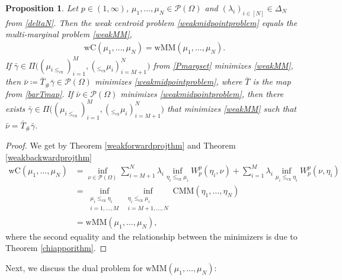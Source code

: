 \documentclass[10pt,a4paper]{amsart}
\newtheorem{prop}[thm]{Proposition}
\begin{document}
\begin{prop}\label{midpoint=MMprop}
	Let $p\in(1,\infty)$, $\mu_1,\dots,\mu_N\in\mathcal P(\Omega)$ and $(\lambda_i)_{i\in[N]}\in\Delta_N$ from \eqref{deltaN}. Then the weak centroid problem \eqref{weakmidpointproblem} equals the multi-marginal problem \eqref{weakMM},
	\begin{gather*}
			\text{wC}(\mu_1,\dots,\mu_N)=\text{wMM}(\mu_1,\dots,\mu_N).
	\end{gather*}
	If $\bar\gamma\in\Pi\big((\mu_{i\leq_{\text{cx}}})_{i=1}^M,(_{\leq_{\text{cx}}}\mu_i)_{i=M+1}^N\big)$ from \eqref{Pmargset} minimizes \eqref{weakMM}, then $\bar\nu\coloneqq\bar T_{\#}\bar\gamma\in\mathcal P(\Omega)$ minimizes \eqref{weakmidpointproblem}, where $\bar T$ is the map from \eqref{barTmap}. If $\bar\nu\in\mathcal P(\Omega)$ minimizes \eqref{weakmidpointproblem}, then there exists $\bar\gamma\in\Pi\big((\mu_{i\leq_{\text{cx}}})_{i=1}^M,(_{\leq_{\text{cx}}}\mu_i)_{i=M+1}^N\big)$ that minimizes \eqref{weakMM} such that $\bar\nu=\bar T_{\#}\bar\gamma$.
\end{prop}
\begin{proof}
	We get by Theorem \ref{weakforwardprojthm} and Theorem \ref{weakbackwardprojthm}
	\begin{align*}
		\text{wC}(\mu_1,\dots,\mu_N)
		&=\inf_{\nu\in\mathcal P(\Omega)}\sum_{i=M+1}^N\mathcal \lambda_i \inf_{\eta_i\leq_{\text{cx}}\mu_i}W_p^p(\eta_i,\nu)+\sum_{i=1}^M\lambda_i\inf_{\mu_i\leq_{\text{cx}}\eta_i}W_p^p(\nu,\eta_i)\\
		&=\inf_{\substack{\mu_i\leq_{\text{cx}}\eta_i\\ i=1,\dots,M}}\inf_{\substack{\eta_i\leq_{\text{cx}}\mu_i\\ i=M+1,\dots,N}}\text{CMM}(\eta_1,\dots,\eta_N)\\
		&=\text{wMM}(\mu_1,\dots,\mu_N),
	\end{align*}
	where the second equality and the relationship between the minimizers is due to Theorem \ref{chiapporithm}.
\end{proof}
Next, we discuss the dual problem for $\text{wMM}(\mu_1,\dots,\mu_N)$:
\end{document}
